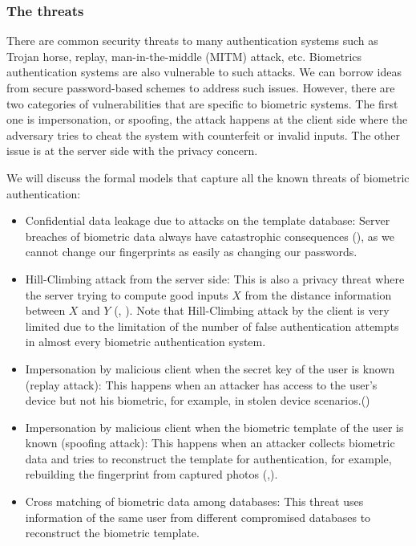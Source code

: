\subsubsection{The threats}
\label{sec:privacyReqs}
There are common security threats to many authentication systems such as Trojan horse, replay, man-in-the-middle (MITM)
attack, etc. Biometrics authentication systems are also vulnerable to such attacks. We can
borrow ideas from secure password-based schemes to address such issues. However, there are two categories of
vulnerabilities that are specific to biometric systems.  The first one is impersonation, or spoofing, the attack happens
at the client side where the adversary tries to cheat the system with counterfeit or invalid inputs.  The other issue is
at the server side with the privacy concern.

We will discuss the formal models that capture all the known threats of biometric authentication:
\begin{itemize}
\item Confidential data leakage due to attacks on the template database: Server breaches of biometric data always have
  catastrophic consequences (\cite{OPMsays563:online}), as we cannot change our fingerprints as easily as changing our
  passwords.
\item Hill-Climbing attack from the server side: This is also a privacy threat where the server trying to compute good
  inputs $X$ from the distance information between $X$ and $Y$ (\cite{uludag2004attacks}, \cite{higo2015privacy}). Note
  that Hill-Climbing attack by the client is very limited due to the limitation of the number of false authentication
  attempts in almost every biometric authentication system.
\item Impersonation by malicious client when the secret key of the user is known (replay attack): This happens when an
  attacker has access to the user's device but not his biometric, for example, in stolen device
  scenarios.(\cite{zhang2015fingerprints})
\item Impersonation by malicious client when the biometric template of the user is known (spoofing attack): This happens
  when an attacker collects biometric data and tries to reconstruct the template for authentication, for example,
  rebuilding the fingerprint from captured photos (\cite{zhang2015fingerprints},\cite{feng2011fingerprint}).
\item Cross matching of biometric data among databases: This threat uses information of the same user from different
  compromised databases to reconstruct the biometric template.
\end{itemize}

